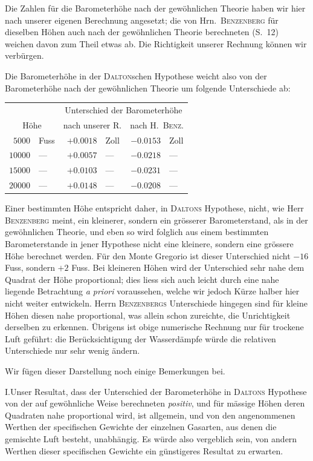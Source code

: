 Die Zahlen für die Barometerhöhe nach der gewöhnlichen Theorie haben wir hier nach unserer eigenen Berechnung angesetzt; die von Hrn.\ \textsc{Benzenberg} für dieselben Höhen auch nach der gewöhnlichen Theorie berechneten (S.\ 12) weichen davon zum Theil etwas ab. Die Richtigkeit unserer Rechnung können wir verbürgen.

Die Barometerhöhe in der \textsc{Dalton}schen Hypothese weicht also von der Barometerhöhe nach der gewöhnlichen Theorie um folgende Unterschiede ab:
\begin{center}\begin{tabular}{rl|rl|rl}
& & \multicolumn{4}{c}{Unterschied der Barometerhöhe}\\
\multicolumn{2}{c|}{Höhe} & \multicolumn{2}{c|}{nach unserer R.} & \multicolumn{2}{c}{nach H.\ \textsc{Benz}.}\\\hline
$5000$ & Fuss & $+0.0018$ & Zoll & $-0.0153$ & Zoll\\
$10000$ & — & $+0.0057$ & — & $-0.0218$ & —\\
$15000$ & — & $+0.0103$ & — & $-0.0231$ & —\\
$20000$ & — & $+0.0148$ & — & $-0.0208$ & —
\end{tabular}\end{center}

Einer bestimmten Höhe entspricht daher, in \textsc{Daltons} Hypothese, nicht, wie Herr \textsc{Benzenberg} meint, ein kleinerer, sondern ein grösserer Barometerstand, als in der gewöhnlichen Theorie, und eben so wird folglich aus einem bestimmten Barometerstande in jener Hypothese nicht eine kleinere, sondern eine grössere Höhe berechnet werden. Für den Monte Gregorio ist dieser Unterschied nicht $-16$ Fuss, sondern $+2$ Fuss. Bei kleineren Höhen wird der Unterschied sehr nahe dem Quadrat der Höhe proportional; dies liess sich auch leicht durch eine nahe liegende Betrachtung \textit{a priori} voraussehen, welche wir jedoch Kürze halber hier nicht weiter entwickeln. Herrn \textsc{Benzenbergs} Unterschiede hingegen sind für kleine Höhen diesen nahe proportional, was allein schon zureichte, die Unrichtigkeit derselben zu erkennen. Übrigens ist obige numerische Rechnung nur für trockene Luft geführt: die Berücksichtigung der Wasserdämpfe würde die relativen Unterschiede nur sehr wenig ändern.

Wir fügen dieser Darstellung noch einige Bemerkungen bei.

I.\quad Unser Resultat, dass der Unterschied der Barometerhöhe in \textsc{Daltons} Hypothese von der auf gewöhnliche Weise berechneten \textit{positiv}, und für mässige Höhen deren Quadraten nahe proportional wird, ist allgemein, und von den angenommenen Werthen der specifischen Gewichte der einzelnen Gasarten, aus denen die gemischte Luft besteht, unabhängig. Es würde also vergeblich sein, von andern Werthen dieser specifischen Gewichte ein günstigeres Resultat zu erwarten.

